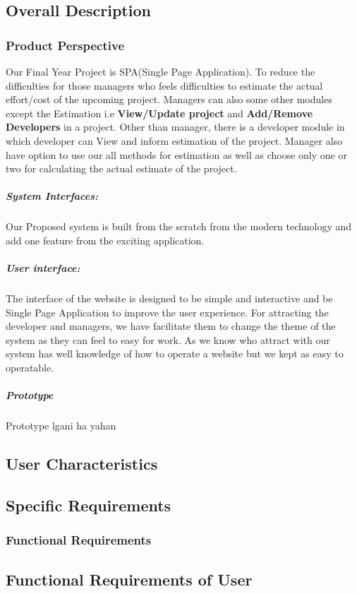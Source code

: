 \subsection{Overall Description}
\subsubsection{Product Perspective}
Our Final Year Project is SPA(Single Page Application). To reduce the difficulties for those managers who feels 
difficulties to estimate the actual effort/cost of the upcoming project. Managers can also some other modules except
the Estimation i.e {\bfseries View/Update project} and {\bfseries Add/Remove Developers} in a project. Other than manager, there is a developer module in which developer 
can View and inform estimation of the project. Manager also have option to use our all methods for estimation as well as choose only one or two for calculating the actual estimate of the project.

    \subparagraph{System Interfaces:}
    Our Proposed system is built from the scratch from the modern technology and add one feature from the exciting application. 
    \subparagraph{User interface: }
    The interface of the website is designed to be simple and interactive and be Single Page Application to improve the user experience. 
    For attracting the developer and managers, we have facilitate them to change the theme of the system as they can feel to easy for work.
    As we know who attract with our system has well knowledge of how to operate a website but we kept as easy to operatable.
    \subparagraph{Prototype}
    \huge{Prototype lgani ha yahan}
\subsection{User Characteristics}
\blindtext[2]

\subsection{Specific Requirements}
    \blindtext[2]
    \subsubsection{Functional Requirements}
    \blindtext[1]

\subsection{Functional Requirements of User}


